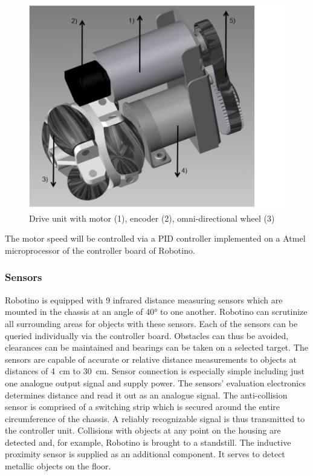 \documentclass[12pt,twoside]{article}
\begin{document}
\begin{appendix}
\begin{figure}[tbh]
\centering
\includegraphics{driveunit.png}
\caption{Drive unit with motor (1), encoder (2), omni-directional wheel
(3)}
\label{apx:fig:driveunit}
\end{figure}

The motor speed will be controlled via a PID controller implemented on
a Atmel microprocessor of the controller board of Robotino.

\subsubsection{Sensors}

Robotino is equipped with 9 infrared distance measuring sensors which
are mounted in the chassis at an angle of \ang{40} to one
another. Robotino can scrutinize all surrounding areas for objects
with these sensors.  Each of the sensors can be queried individually
via the controller board. Obstacles can thus be avoided, clearances
can be maintained and bearings can be taken on a selected target. The
sensors are capable of accurate or relative distance measurements to
objects at distances of \SI{4}{\centi\metre} to
\SI{30}{\centi\metre}. Sensor connection is especially simple
including just one analogue output signal and supply power. The
sensors' evaluation electronics determines distance and read it out as
an analogue signal.  The anti-collision sensor is comprised of a
switching strip which is secured around the entire circumference of
the chassis. A reliably recognizable signal is thus transmitted to the
controller unit.  Collisions with objects at any point on the housing
are detected and, for example, Robotino is brought to a
standstill. The inductive proximity sensor is supplied as an
additional component. It serves to detect metallic objects on the
floor.


\end{appendix}
\end{document}
